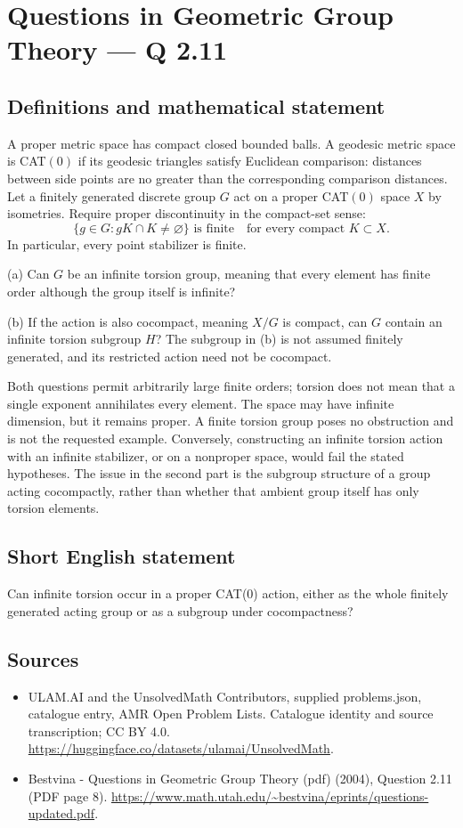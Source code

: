 \documentclass[11pt,a4paper]{article}
\begin{document}
\section*{Questions in Geometric Group Theory — Q 2.11}\label{statement}

\subsection{Definitions and mathematical statement}
A proper metric space has compact closed bounded balls. A geodesic metric space is CAT$(0)$ if its geodesic triangles satisfy Euclidean comparison: distances between side points are no greater than the corresponding comparison distances. Let a finitely generated discrete group $G$ act on a proper CAT$(0)$ space $X$ by isometries. Require proper discontinuity in the compact-set sense:
\[
 \{g\in G:gK\cap K\ne\varnothing\}\text{ is finite}
 \quad\text{for every compact }K\subset X.
\]
In particular, every point stabilizer is finite.

(a) Can $G$ be an infinite torsion group, meaning that every element has finite order although the group itself is infinite?

(b) If the action is also cocompact, meaning $X/G$ is compact, can $G$ contain an infinite torsion subgroup $H$? The subgroup in (b) is not assumed finitely generated, and its restricted action need not be cocompact.

Both questions permit arbitrarily large finite orders; torsion does not mean that a single exponent annihilates every element. The space may have infinite dimension, but it remains proper. A finite torsion group poses no obstruction and is not the requested example. Conversely, constructing an infinite torsion action with an infinite stabilizer, or on a nonproper space, would fail the stated hypotheses. The issue in the second part is the subgroup structure of a group acting cocompactly, rather than whether that ambient group itself has only torsion elements.
\subsection{Short English statement}
Can infinite torsion occur in a proper CAT(0) action, either as the whole finitely generated acting group or as a subgroup under cocompactness?
\subsection{Sources}
\begin{itemize}
\item[S1] ULAM.AI and the UnsolvedMath Contributors, supplied problems.json, catalogue entry, AMR Open Problem Lists. Catalogue identity and source transcription; CC BY 4.0.
\url{https://huggingface.co/datasets/ulamai/UnsolvedMath}.
\item[S2] Bestvina - Questions in Geometric Group Theory (pdf) (2004), Question 2.11 (PDF page 8). 
\url{https://www.math.utah.edu/~bestvina/eprints/questions-updated.pdf}.
\end{itemize}
\end{document}
